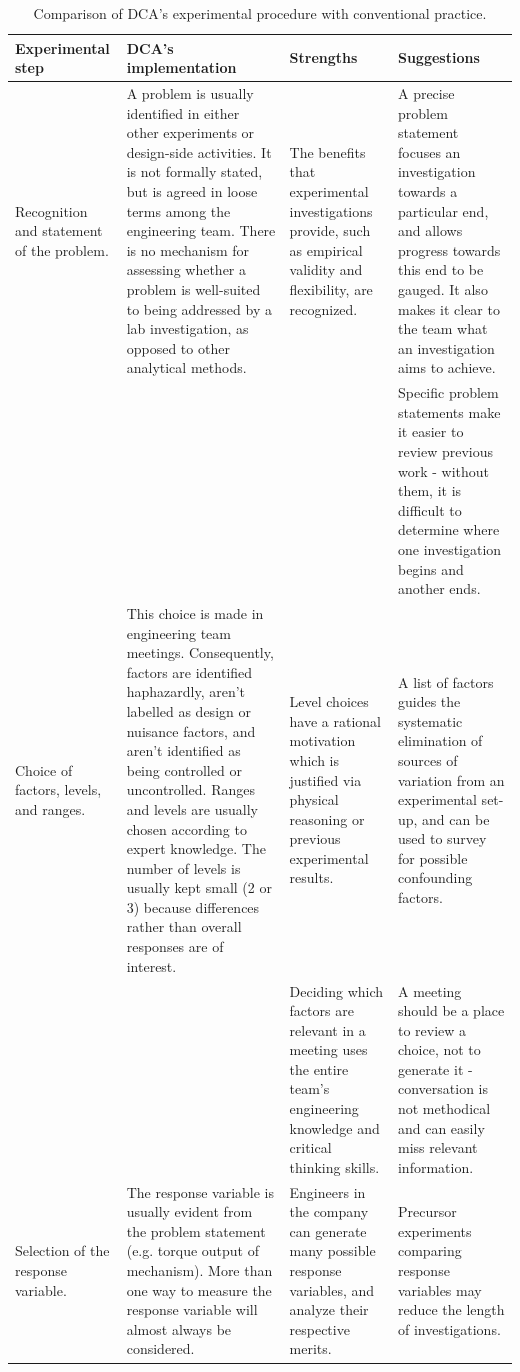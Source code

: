 \documentclass[11pt,a4paper,article]{memoir} %
\begin{document}
\begin{landscape}
\vspace*{-3cm}
{\tiny
\begin{longtable}{p{4cm} p{7cm} p{6cm} p{6cm}}
\caption{Comparison of DCA's experimental procedure with conventional practice.}\\
\toprule[0.15em]
\textbf{Experimental step} & \textbf{DCA's implementation} & \textbf{Strengths} & \textbf{Suggestions} \\
\toprule[0.15em]
Recognition and statement of the problem. & A problem is usually identified in either other experiments or design-side activities. It is not formally stated, but is agreed in loose terms among the engineering team. There is no mechanism for assessing whether a problem is well-suited to being addressed by a lab investigation, as opposed to other analytical methods. & The benefits that experimental investigations provide, such as empirical validity and flexibility, are recognized. & A precise problem statement focuses an investigation towards a particular end, and allows progress towards this end to be gauged. It also makes it clear to the team what an investigation aims to achieve. \\ 
 &  &  & Specific problem statements make it easier to review previous work - without them, it is difficult to determine where one investigation begins and another ends. \\ 
\cmidrule{1-4}
Choice of factors, levels, and ranges. & This choice is made in engineering team meetings. Consequently, factors are identified haphazardly, aren't labelled as design or nuisance factors, and aren't identified as being controlled or uncontrolled. Ranges and levels are usually chosen according to expert knowledge. The number of levels is usually kept small (2 or 3) because differences rather than overall responses are of interest. & Level choices have a rational motivation which is justified via physical reasoning or previous experimental results. & A list of factors guides the systematic elimination of sources of variation from an experimental set-up, and can be used to survey for possible confounding factors. \\ 
 &  & Deciding which factors are relevant in a meeting uses the entire team's engineering knowledge and critical thinking skills. & A meeting should be a place to review a choice, not to generate it - conversation is not methodical and can easily miss relevant information. \\ 
\cmidrule{1-4}
Selection of the response variable. & The response variable is usually evident from the problem statement (e.g. torque output of mechanism). More than one way to measure the response variable will almost always be considered. & Engineers in the company can generate many possible response variables, and analyze their respective merits. & Precursor experiments comparing response variables may reduce the length of investigations. \\ 

\end{longtable}}
\end{landscape}
\end{document}
